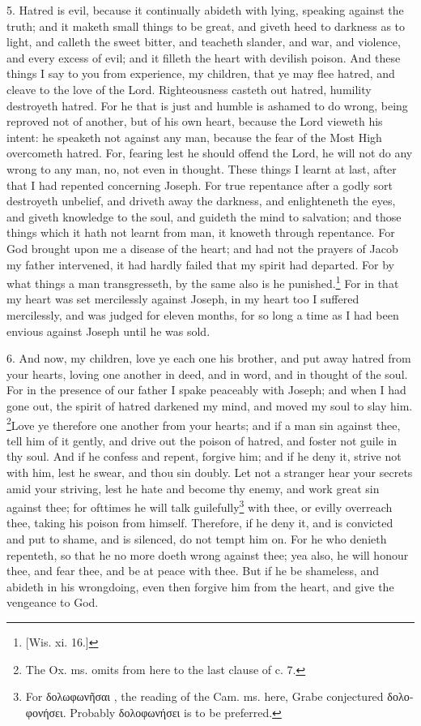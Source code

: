 5. Hatred is evil, because it continually abideth with lying, speaking against the truth; and it maketh small things to be great, and giveth heed to darkness as to light, and calleth the sweet bitter, and teacheth slander, and war, and violence, and every excess of evil; and it filleth the heart with devilish poison. And these things I say to you from experience, my children, that ye may flee hatred, and cleave to the love of the Lord. Righteousness casteth out hatred, humility destroyeth hatred. For he that is just and humble is ashamed to do wrong, being reproved not of another, but of his own heart, because the Lord vieweth his intent: he speaketh not against any man, because the fear of the Most High overcometh hatred. For, fearing lest he should offend the Lord, he will not do any wrong to any man, no, not even in thought. These things I learnt at last, after that I had repented concerning Joseph. For true repentance after a godly sort destroyeth unbelief, and driveth away the darkness, and enlighteneth the eyes, and giveth knowledge to the soul, and guideth the mind to salvation; and those things which it hath not learnt from man, it knoweth through repentance. For God brought upon me a disease of the heart; and had not the prayers of Jacob my father intervened, it had hardly failed that my spirit had departed. For by what things a man transgresseth, by the same also is he punished.\footnote{[Wis. xi. 16.]} For in that my heart was set mercilessly against Joseph, in my heart too I suffered mercilessly, and was judged for eleven months, for so long a time as I had been envious against Joseph until he was sold.

6. And now, my children, love ye each one his brother, and put away hatred from your hearts, loving one another in deed, and in word, and in thought of the soul. For in the presence of our father I spake peaceably with Joseph; and when I had gone out, the spirit of hatred darkened my mind, and moved my soul to slay him. \footnote{The Ox. ms. omits from here to the last clause of c. 7.}Love ye therefore one another from your hearts; and if a man sin against thee, tell him of it gently, and drive out the poison of hatred, and foster not guile in thy soul. And if he confess and repent, forgive him; and if he deny it, strive not with him, lest he swear, and thou sin doubly. Let not a stranger hear your secrets amid your striving, lest he hate and become thy enemy, and work great sin against thee; for ofttimes he will talk guilefully\footnote{For \textgreek{δολωφωνῆσαι} , the reading of the Cam. ms. here, Grabe conjectured \textgreek{δολοφονήσει}. Probably \textgreek{δολοφωνήσει} is to be preferred.} with thee, or evilly overreach thee, taking his poison from himself. Therefore, if he deny it, and is convicted and put to shame, and is silenced, do not tempt him on. For he who denieth repenteth, so that he no more doeth wrong against thee; yea also, he will honour thee, and fear thee, and be at peace with thee. But if he be shameless, and abideth in his wrongdoing, even then forgive him from the heart, and give the vengeance to God.

